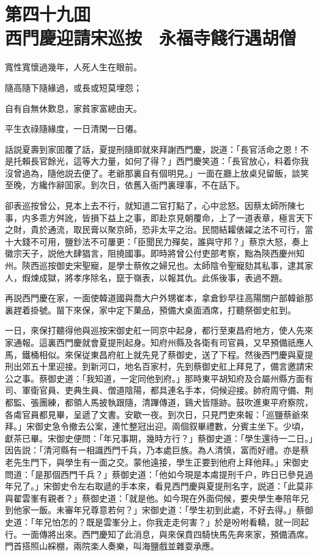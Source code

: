 
\chapter*{第四十九囬　\\西門慶迎請宋巡按　永福寺餞行遇胡僧}


\begin{myquote}
寬性寬懷過幾年，人死人生在眼前。

隨高隨下隨緣過，或長或短莫埋怨；

自有自無休歎息，家貧家富總由天。

平生衣祿隨緣度，一日清閑一日僊。
\end{myquote}

話説夏壽到家囬覆了話，夏提刑隨即就來拜謝西門慶，説道：「長官活命之恩！不是托賴長官餘光，這等大力量，如何了得？」西門慶笑道：「長官放心，料着你我沒曾過為，隨他説去便了。老爺那裏自有個明見。」一面在廳上放桌兒留飯，談笑至晚，方纔作辭囬家。到次日，依舊入衙門裏理事，不在話下。

卻表巡按曾公，見本上去不行，就知道二官打點了，心中忿怒。因蔡太師所陳七事，内多乖方舛訛，皆損下益上之事，即赴京見朝覆命，上了一道表章，極言天下之財，貴於通流，取民膏以聚京師，恐非太平之治。民間結糶俵糴之法不可行，當十大錢不可用，鹽鈔法不可屢更：「臣聞民力殫矣，誰與守邦？」蔡京大怒，奏上徽宗天子，説他大肆猖言，阻撓國事。即時將曾公付吏部考察，黜為陝西慶州知州。陝西巡按御史宋聖寵，是學士蔡攸之婦兄也。太師陰令聖寵劾其私事，逮其家人，煆煉成獄，將孝序除名，竄于嶺表，以報其仇。此係後事，表過不題。

再説西門慶在家，一面使韓道國與喬大户外甥崔本，拿倉鈔早往高陽關户部韓爺那裏趕着掛號。㽞下來保，家中定下菓品，預備大桌面酒席，打聽祭御史舡到。

一日，來保打聽得他與巡按宋御史舡一同京中起身，都行至東昌府地方，使人先來家通報。這裏西門慶就會夏提刑起身。知府州縣及各衛有司官員，又早預備祇應人馬，鐵桶相似。來保従東昌府舡上就先見了蔡御史，送了下程。然後西門慶與夏提刑出郊五十里迎接。到新河口，地名百家村，先到蔡御史舡上拜見了，備言邀請宋公之事。蔡御史道：「我知道，一定同他到府。」那時東平胡知府及合屬州縣方面有司、軍衛官員、吏典生員、僧道陰陽，都具連名手本，伺候迎接。帥府周守備、荆都監、張團練，都領人馬披執跟隨，清蹕傳道，鷄犬皆隱跡。鼓吹進東平府察院，各䖏官員都見畢，呈遞了文書。安歇一夜。到次日，只見門吏來報：「巡鹽蔡爺來拜。」宋御史急令撤去公案，連忙整冠出迎。兩個叙畢禮數，分賓主坐下。少頃，獻茶已畢。宋御史便問：「年兄事期，幾時方行？」蔡御史道：「學生還待一二日。」因告説：「清河縣有一相識西門千兵，乃本處巨族。為人清慎，富而好禮。亦是蔡老先生門下，與學生有一面之交。蒙他遠接，學生正要到他府上拜他拜。」宋御史問道：「是那個西門千兵？」蔡御史道：「他如今現是本䖏提刑千户，昨日已參見過年兄了。」宋御史令左右取遞的手本來，看見西門慶與夏提刑名字，説道：「此莫非與翟雲峯有親者？」蔡御史道：「就是他。如今現在外面伺候，要央學生奉陪年兄到他家一飯。未審年兄尊意若何？」宋御史道：「學生初到此處，不好去得。」蔡御史道：「年兄怕怎的？既是雲峯分上，你我走走何害？」於是吩咐看轎，就一同起行。一面傳將出來。西門慶知了此消息，與來保賁四騎快馬先奔來家，預備酒席。門首搭照山綵棚，兩院楽人奏樂，叫海鹽戲並雜耍承應。

